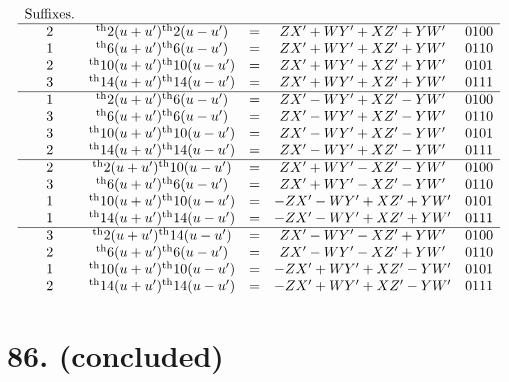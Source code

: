 \documentclass[11pt,a4paper]{book}
\providecommand{\uth}{\textsuperscript{th}}
\begin{document}
\[
\begin{array}{ccccc}
\text{Suffixes.} & & & & \\
\hline
2 & \uth{2}(u+u')\uth{2}(u-u') &=& ZX' + WY' + XZ' + YW' & 0100 \\
1 & \uth{6}(u+u')\uth{6}(u-u') &=& ZX' + WY' + XZ' + YW' & 0110 \\
2 & \uth{10}(u+u')\uth{10}(u-u') &=& ZX' + WY' + XZ' + YW' & 0101 \\
3 & \uth{14}(u+u')\uth{14}(u-u') &=& ZX' + WY' + XZ' + YW' & 0111 \\
\hline
1 & \uth{2}(u+u')\uth{6}(u-u') &=& ZX' - WY' + XZ' - YW' & 0100 \\
3 & \uth{6}(u+u')\uth{6}(u-u') &=& ZX' - WY' + XZ' - YW' & 0110 \\
3 & \uth{10}(u+u')\uth{10}(u-u') &=& ZX' - WY' + XZ' - YW' & 0101 \\
2 & \uth{14}(u+u')\uth{14}(u-u') &=& ZX' - WY' + XZ' - YW' & 0111 \\
\hline
2 & \uth{2}(u+u')\uth{10}(u-u') &=& ZX' + WY' - XZ' - YW' & 0100 \\
3 & \uth{6}(u+u')\uth{6}(u-u') &=& ZX' + WY' - XZ' - YW' & 0110 \\
1 & \uth{10}(u+u')\uth{10}(u-u') &=& -ZX' - WY' + XZ' + YW' & 0101 \\
1 & \uth{14}(u+u')\uth{14}(u-u') &=& -ZX' - WY' + XZ' + YW' & 0111 \\
\hline
3 & \uth{2}(u+u')\uth{14}(u-u') &=& ZX' - WY' - XZ' + YW' & 0100 \\
2 & \uth{6}(u+u')\uth{6}(u-u') &=& ZX' - WY' - XZ' + YW' & 0110 \\
1 & \uth{10}(u+u')\uth{10}(u-u') &=& -ZX' + WY' + XZ' - YW' & 0101 \\
2 & \uth{14}(u+u')\uth{14}(u-u') &=& -ZX' + WY' + XZ' - YW' & 0111
\end{array}
\]

\newpage
\section*{86. (concluded)}
\label{sec:86conc}
\end{document}
